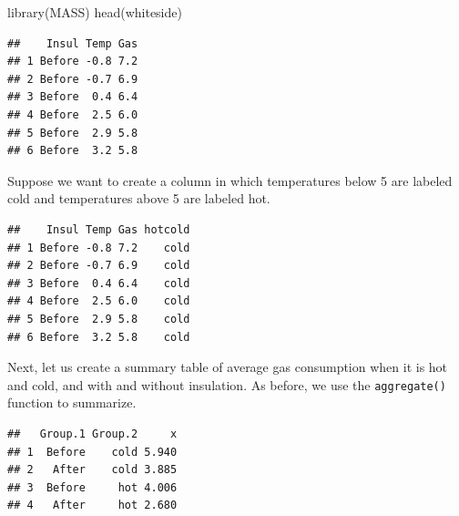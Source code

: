 \documentclass[
]{article}
\newenvironment{Shaded}{\begin{snugshade}}{\end{snugshade}}
\newcommand{\DecValTok}[1]{\textcolor[rgb]{0.00,0.00,0.81}{#1}}
\newcommand{\FunctionTok}[1]{\textcolor[rgb]{0.00,0.00,0.00}{#1}}
\newcommand{\NormalTok}[1]{#1}
\newcommand{\OtherTok}[1]{\textcolor[rgb]{0.56,0.35,0.01}{#1}}
\newcommand{\SpecialCharTok}[1]{\textcolor[rgb]{0.00,0.00,0.00}{#1}}
\newcommand{\StringTok}[1]{\textcolor[rgb]{0.31,0.60,0.02}{#1}}
\begin{document}
\begin{Shaded}
\begin{Highlighting}[]
\FunctionTok{library}\NormalTok{(MASS)}
\FunctionTok{head}\NormalTok{(whiteside)}
\end{Highlighting}
\end{Shaded}

\begin{verbatim}
##    Insul Temp Gas
## 1 Before -0.8 7.2
## 2 Before -0.7 6.9
## 3 Before  0.4 6.4
## 4 Before  2.5 6.0
## 5 Before  2.9 5.8
## 6 Before  3.2 5.8
\end{verbatim}

Suppose we want to create a column in which temperatures below 5 are
labeled cold and temperatures above 5 are labeled hot.

\begin{Shaded}
\end{Shaded}

\begin{verbatim}
##    Insul Temp Gas hotcold
## 1 Before -0.8 7.2    cold
## 2 Before -0.7 6.9    cold
## 3 Before  0.4 6.4    cold
## 4 Before  2.5 6.0    cold
## 5 Before  2.9 5.8    cold
## 6 Before  3.2 5.8    cold
\end{verbatim}

Next, let us create a summary table of average gas consumption when it
is hot and cold, and with and without insulation. As before, we use the
\texttt{aggregate()} function to summarize.

\begin{Shaded}
\end{Shaded}

\begin{verbatim}
##   Group.1 Group.2     x
## 1  Before    cold 5.940
## 2   After    cold 3.885
## 3  Before     hot 4.006
## 4   After     hot 2.680
\end{verbatim}
\end{document}
